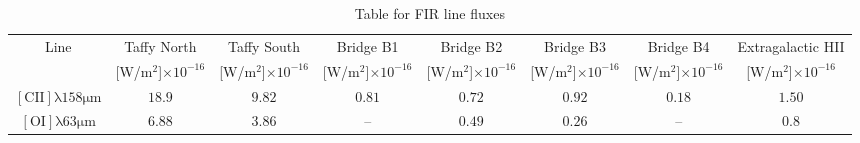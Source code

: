 \documentclass[9pt]{article}
\begin{document}
\begin{landscape}
\begin{table}
\begin{center}
\begin{tabular}{c | c | c | c | c | c | c | c}
Line & Taffy North & Taffy South & Bridge B1 & Bridge B2 & Bridge B3 & Bridge B4  & Extragalactic HII \\
        & [W/m$^2$]$\times10^{-16}$ & [W/m$^2$]$\times10^{-16}$ & [W/m$^2$]$\times10^{-16}$ & [W/m$^2$]$\times10^{-16}$ & [W/m$^2$]$\times10^{-16}$ & [W/m$^2$]$\times10^{-16}$ & [W/m$^2$]$\times10^{-16}$ \\
$\mathrm{[CII]\lambda158\mu m}$ & $18.9$ & $9.82$ & $0.81$ & $0.72$ & $0.92$ & $0.18$ & $1.50$ \\
$\mathrm{[OI]\lambda63\mu m}$ & $6.88$ & $3.86$ & -- & $0.49$ & $0.26$ & -- & $0.8$ \\

\end{tabular}
\caption{Table for FIR line fluxes}
\end{center}
\end{table}
\end{landscape}
\end{document}

